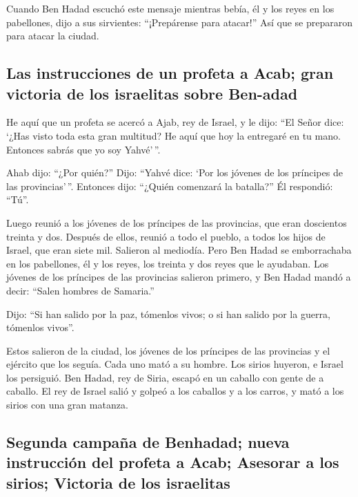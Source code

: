  Cuando Ben Hadad escuchó este mensaje mientras bebía, él
y los reyes en los pabellones, dijo a sus sirvientes: ``¡Prepárense para
atacar!'' Así que se prepararon para atacar la ciudad.

\hypertarget{las-instrucciones-de-un-profeta-a-acab-gran-victoria-de-los-israelitas-sobre-ben-adad}{%
\subsection{Las instrucciones de un profeta a Acab; gran victoria de los
israelitas sobre
Ben-adad}\label{las-instrucciones-de-un-profeta-a-acab-gran-victoria-de-los-israelitas-sobre-ben-adad}}

 He aquí que un profeta se acercó a Ajab, rey de Israel,
y le dijo: ``El Señor dice: `¿Has visto toda esta gran multitud? He aquí
que hoy la entregaré en tu mano. Entonces sabrás que yo soy Yahvé'\,''.

 Ahab dijo: ``¿Por quién?'' Dijo: ``Yahvé dice: `Por los
jóvenes de los príncipes de las provincias'\,''. Entonces dijo: ``¿Quién
comenzará la batalla?'' Él respondió: ``Tú''.

 Luego reunió a los jóvenes de los príncipes de las
provincias, que eran doscientos treinta y dos. Después de ellos, reunió
a todo el pueblo, a todos los hijos de Israel, que eran siete mil.
 Salieron al mediodía. Pero Ben Hadad se emborrachaba en
los pabellones, él y los reyes, los treinta y dos reyes que le ayudaban.
 Los jóvenes de los príncipes de las provincias salieron
primero, y Ben Hadad mandó a decir: ``Salen hombres de Samaria.''

 Dijo: ``Si han salido por la paz, tómenlos vivos; o si
han salido por la guerra, tómenlos vivos''.

 Estos salieron de la ciudad, los jóvenes de los
príncipes de las provincias y el ejército que los seguía.
 Cada uno mató a su hombre. Los sirios huyeron, e Israel
los persiguió. Ben Hadad, rey de Siria, escapó en un caballo con gente
de a caballo.  El rey de Israel salió y golpeó a los
caballos y a los carros, y mató a los sirios con una gran matanza.

\hypertarget{segunda-campauxf1a-de-benhadad-nueva-instrucciuxf3n-del-profeta-a-acab-asesorar-a-los-sirios-victoria-de-los-israelitas}{%
\subsection{Segunda campaña de Benhadad; nueva instrucción del profeta a
Acab; Asesorar a los sirios; Victoria de los
israelitas}\label{segunda-campauxf1a-de-benhadad-nueva-instrucciuxf3n-del-profeta-a-acab-asesorar-a-los-sirios-victoria-de-los-israelitas}}

